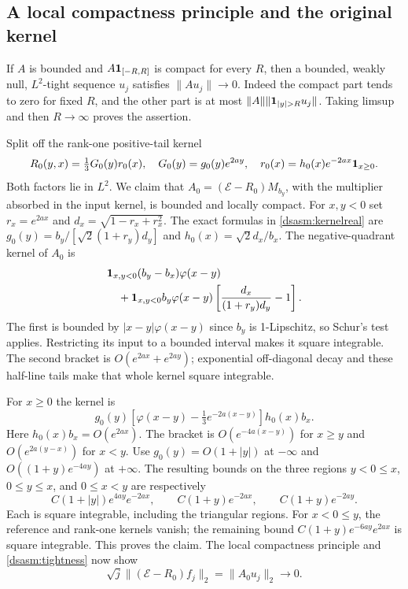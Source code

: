 \documentclass[11pt,letterpaper]{article}
\theoremstyle{remark}\newtheorem{remark}[theorem]{Remark}
\begin{document}
\subsection{A local compactness principle and the original kernel}
If $A$ is bounded and $A\mathbf1_{[-R,R]}$ is compact for every $R$,
then a bounded, weakly null, $L^2$-tight sequence $u_j$ satisfies
$\|Au_j\|\to0$. Indeed the compact part tends to zero for fixed
$R$, and the other part is at most $\|A\|\|\one_{|y|>R}u_j\|$.
Taking limsup and then $R\to\infty$ proves the assertion.

Split off the rank-one positive-tail kernel
\[
 R_0(y,x)=\tfrac13G_0(y)r_0(x),\quad
 G_0(y)=g_0(y)e^{2ay},\quad
 r_0(x)=h_0(x)e^{-2ax}\mathbf1_{x\ge0}.
\]
Both factors lie in $L^2$. We claim that
$A_0=(\mathcal E-R_0)M_{b_y}$, with the multiplier absorbed in
the input kernel, is bounded and locally compact.
For $x,y<0$ set $r_x=e^{2ax}$ and $d_x=\sqrt{1-r_x+r_x^2}$.
The exact formulas in \eqref{dsasm:kernelreal} are
$g_0(y)=b_y/[\sqrt2(1+r_y)d_y]$ and
$h_0(x)=\sqrt2d_x/b_x$. The negative-quadrant kernel of $A_0$ is
\begin{align*}
 &\mathbf1_{x,y<0}(b_y-b_x)\varphi(x-y)\\
 &\quad+\mathbf1_{x,y<0}b_y\varphi(x-y)
                  \left[\frac{d_x}{(1+r_y)d_y}-1\right].
\end{align*}
The first is bounded by $|x-y|\varphi(x-y)$ since $b_y$ is
1-Lipschitz, so Schur's test applies. Restricting its input to a
bounded interval makes it square integrable. The second bracket is
$O(e^{2ax}+e^{2ay})$; exponential off-diagonal decay and these half-line
tails make that whole kernel square integrable.

For $x\ge0$ the kernel is
\[
 g_0(y)\left[\varphi(x-y)-\tfrac13e^{-2a(x-y)}\right]h_0(x)b_x.
\]
Here $h_0(x)b_x=O(e^{2ax})$. The bracket is $O(e^{-4a(x-y)})$
for $x\ge y$ and $O(e^{2a(y-x)})$ for $x<y$.
Use $g_0(y)=O(1+|y|)$ at $-\infty$ and
$O((1+y)e^{-4ay})$ at $+\infty$. The resulting bounds on the three
regions $y<0\le x$, $0\le y\le x$, and $0\le x<y$ are respectively
\[
 C(1+|y|)e^{4ay}e^{-2ax},\qquad
 C(1+y)e^{-2ax},\qquad C(1+y)e^{-2ay}.
\]
Each is square integrable, including the triangular regions.
For $x<0\le y$, the reference and rank-one kernels vanish;
the remaining bound $C(1+y)e^{-6ay}e^{2ax}$ is square integrable.
This proves the claim. The local compactness principle and
\eqref{dsasm:tightness} now show
\begin{equation}\label{dsasm:minusRrate}
 \sqrt j\|(\mathcal E-R_0)f_j\|_2=\|A_0u_j\|_2\longrightarrow0.
\end{equation}
\end{document}
